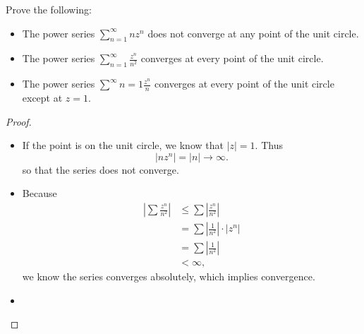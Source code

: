 \documentclass[12pt]{article}
\newenvironment{statement}[2][Statement]{\begin{trivlist}
\item[\hskip \labelsep {\bfseries #1}\hskip \labelsep {\bfseries #2.}]}{\end{trivlist}}
\begin{document}
\begin{statement}[Problem]{(Tie) 3}
  Prove the following:
  \begin{itemize}
    \item[(a)] The power series $\sum^{\infty}_{n=1} nz^n$ does not converge at any point of the unit circle. 
    \item[(b)] The power series $\sum^{\infty}_{n=1} \frac{z^n}{n^2}$ converges at every point of the unit circle. 
    \item[(c)] The power series $\sum^{\infty}{n=1} \frac{z^n}{n}$ converges at every point of the unit circle except at $z=1$. 
  \end{itemize}
\end{statement}
\begin{proof}
  \begin{itemize}
    \item[(a)] If the point is on the unit circle, we know that $\lvert z \rvert = 1$. Thus 
      \begin{equation*} 
        \lvert nz^n \rvert = \lvert n \rvert \to \infty.
      \end{equation*}
      so that the series does not converge. 
    \item[(b)] Because 
      \begin{align*}
        \left\lvert \sum \frac{z^n}{n^2} \right\rvert & \leq \sum \left\lvert \frac{z^n}{n^2} \right\rvert \\
                                                      &= \sum \left\lvert \frac{1}{n^2} \right\rvert \cdot \left\lvert z^n \right\rvert \\
                                                      &= \sum \left\lvert \frac{1}{n^2} \right\rvert \\
                                                      & < \infty,
      \end{align*}
      we know the series converges absolutely, which implies convergence. 
    \item[(c)]
  \end{itemize}
\end{proof}
\end{document}
